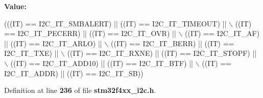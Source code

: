 {\bfseries Value\+:}
\begin{DoxyCode}
(((IT) == I2C_IT_SMBALERT) || ((IT) == I2C_IT_TIMEOUT) || \(\backslash\)
                           ((IT) == I2C_IT_PECERR) || ((IT) == I2C_IT_OVR) || \(\backslash\)
                           ((IT) == I2C_IT_AF) || ((IT) == I2C_IT_ARLO) || \(\backslash\)
                           ((IT) == I2C_IT_BERR) || ((IT) == I2C_IT_TXE) || \(\backslash\)
                           ((IT) == I2C_IT_RXNE) || ((IT) == I2C_IT_STOPF) || \(\backslash\)
                           ((IT) == I2C_IT_ADD10) || ((IT) == I2C_IT_BTF) || \(\backslash\)
                           ((IT) == I2C_IT_ADDR) || ((IT) == I2C_IT_SB))
\end{DoxyCode}


Definition at line \textbf{ 236} of file \textbf{ stm32f4xx\+\_\+i2c.\+h}.

